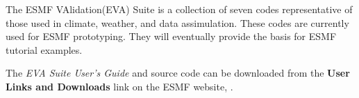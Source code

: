 The ESMF VAlidation(EVA) Suite is a collection of seven codes
representative of those used in climate, weather, and data
assimulation. These codes are currently used for ESMF prototyping.
They will eventually provide the basis for ESMF tutorial examples.

The {\it EVA Suite User's Guide} and source code can be downloaded from the {\bf
User Links and Downloads} link on the ESMF website, 
.




























